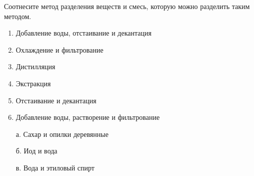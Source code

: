 
Соотнесите метод
разделения веществ и смесь, которую можно разделить таким методом.

        \begin{enumerate}
            \item Добавление воды, отстаивание и декантация
            \item Охлаждение и фильтрование
            \item Дистилляция
            \item Экстракция
            \item Отстаивание и декантация
            \item Добавление воды, растворение и фильтрование
        \end{enumerate}

        \begin{enumerate}
            \item[а.] Сахар и опилки деревянные
            \item[б.] Иод и вода
            \item[в.] Вода и этиловый спирт
        \end{enumerate}


